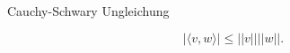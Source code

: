 \documentclass[class=article, crop=false]{standalone}
\begin{document}
\begin{zettel}{Cauchy-Schwary Ungleichung}

\begin{flashcard}[b2yrqph6]{}
	\begin{lemma}
		\[
			|\langle v,w\rangle| \leq  ||v|| ||w||
		.\]
	\end{lemma}
\end{flashcard}
\end{zettel}
\end{document}
